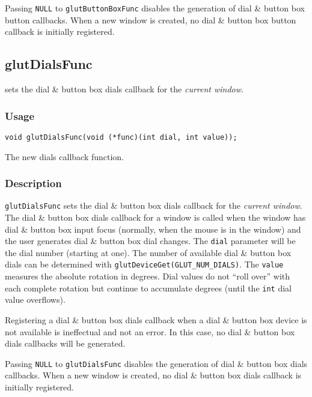 Passing {\tt NULL} to {\tt glutButtonBoxFunc} disables the generation of
dial \& button box button callbacks.  When a new window is created, no
dial \& button box button callback is initially registered.

\subsection{glutDialsFunc}

 sets the dial \& button box dials callback for
the {\em current window}.

\subsubsection*{Usage}
\begin{verbatim}
void glutDialsFunc(void (*func)(int dial, int value));
\end{verbatim}
\begin{description}
\itemsep 0in
\item[{\tt func}]
The new dials callback function.
\end{description}

\subsubsection*{Description}

{\tt glutDialsFunc} sets the dial \& button box dials callback for the {\em
current window}.  The dial \& button box dials callback for a window is called when the
window has dial \& button box input focus (normally, when the mouse is in the window)
and the user generates dial \& button box dial changes.  The {\tt dial} parameter
will be the dial number (starting at one).  The number of available dial \&
button box
dials can be determined with {\tt glutDeviceGet(GLUT\_NUM\_DIALS)}.
The {\tt value} measures the absolute rotation in degrees.
Dial values do not ``roll over'' with each complete rotation but
continue to accumulate degrees (until the {\tt int} dial value
overflows).

Registering a dial \& button box dials callback when a dial \& button box
device is not available
is ineffectual and not an error.  In this case, no dial \& button box dials callbacks
will be generated.

Passing {\tt NULL} to {\tt glutDialsFunc} disables the generation of
dial \& button box dials callbacks.  When a new window is created, no
dial \& button box dials callback is initially registered.

